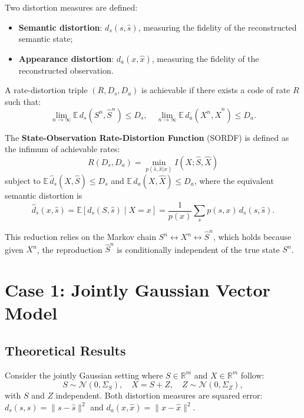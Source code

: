 \documentclass[conference]{IEEEtran}
\begin{document}
Two distortion measures are defined:
\begin{itemize}
    \item \textbf{Semantic distortion}: $d_s(s, \hat{s})$, measuring the fidelity of the reconstructed semantic state;
    \item \textbf{Appearance distortion}: $d_a(x, \hat{x})$, measuring the fidelity of the reconstructed observation.
\end{itemize}

A rate-distortion triple $(R, D_s, D_a)$ is achievable if there exists a code of rate $R$ such that:
\begin{equation}
\lim_{n\to\infty} \mathbb{E}\, d_s(S^n, \hat{S}^n) \leq D_s, \quad
\lim_{n\to\infty} \mathbb{E}\, d_a(X^n, \hat{X}^n) \leq D_a.
\end{equation}

The \textbf{State-Observation Rate-Distortion Function} (SORDF) is defined as the infimum of achievable rates:
\begin{equation}
R(D_s, D_a) = \min_{p(\hat{s}, \hat{x}|x)} I(X; \hat{S}, \hat{X})
\end{equation}
subject to $\mathbb{E}\,\hat{d}_s(X, \hat{S}) \leq D_s$ and $\mathbb{E}\,d_a(X, \hat{X}) \leq D_a$, where the equivalent semantic distortion is
\begin{equation}
\hat{d}_s(x, \hat{s}) = \mathbb{E}[d_s(S, \hat{s}) \mid X = x] = \frac{1}{p(x)}\sum_{s} p(s,x)\, d_s(s, \hat{s}).
\end{equation}

This reduction relies on the Markov chain $S^n \leftrightarrow X^n \leftrightarrow \hat{S}^n$, which holds because given $X^n$, the reproduction $\hat{S}^n$ is conditionally independent of the true state $S^n$.

\section{Case 1: Jointly Gaussian Vector Model}

\subsection{Theoretical Results}

Consider the jointly Gaussian setting where $S \in \mathbb{R}^m$ and $X \in \mathbb{R}^m$ follow:
\begin{equation}
S \sim \mathcal{N}(0, \Sigma_S), \quad
X = S + Z, \quad Z \sim \mathcal{N}(0, \Sigma_Z),
\end{equation}
with $S$ and $Z$ independent. Both distortion measures are squared error: $d_s(s, \hat{s}) = \|s - \hat{s}\|^2$ and $d_a(x, \hat{x}) = \|x - \hat{x}\|^2$.
\end{document}
